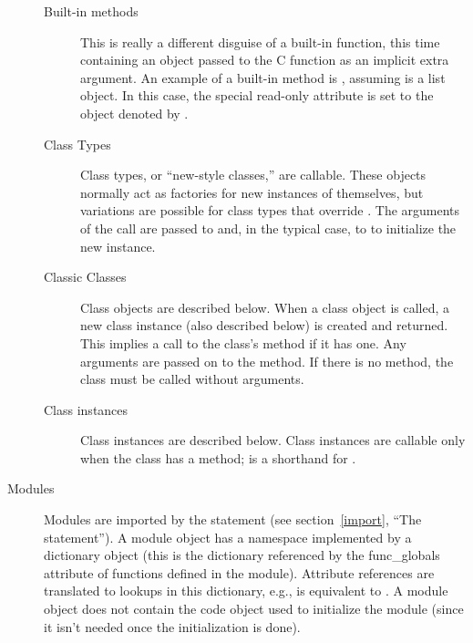 \begin{description}
\begin{description}
\item[Built-in methods]
This is really a different disguise of a built-in function, this time
containing an object passed to the C function as an implicit extra
argument.  An example of a built-in method is
, assuming
 is a list object.
In this case, the special read-only attribute  is set
to the object denoted by .

\item[Class Types]
Class types, or ``new-style classes,'' are callable.  These objects
normally act as factories for new instances of themselves, but
variations are possible for class types that override
.  The arguments of the call are passed to
 and, in the typical case, to  to
initialize the new instance.

\item[Classic Classes]
Class objects are described below.  When a class object is called,
a new class instance (also described below) is created and
returned.  This implies a call to the class's  method
if it has one.  Any arguments are passed on to the 
method.  If there is no  method, the class must be called
without arguments.

\item[Class instances]
Class instances are described below.  Class instances are callable
only when the class has a  method; 
is a shorthand for .

\end{description}

\item[Modules]
Modules are imported by the  statement (see
section~\ref{import}, ``The  statement'').%
A module object has a namespace implemented by a dictionary object
(this is the dictionary referenced by the func_globals attribute of
functions defined in the module).  Attribute references are translated
to lookups in this dictionary, e.g.,  is equivalent to
.
A module object does not contain the code object used to
initialize the module (since it isn't needed once the initialization
is done).


\end{description}
